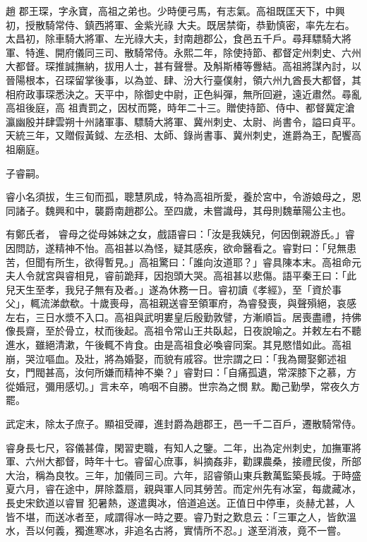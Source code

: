 
\begin{pinyinscope}

 趙
 郡王琛，字永寶，高祖之弟也。少時便弓馬，有志氣。高祖既匡天下，中興初，授散騎常侍、鎮西將軍、金紫光祿
 大夫。既居禁衛，恭勤慎密，率先左右。太昌初，除車騎大將軍、左光祿大夫，封南趙郡公，食邑五千戶。尋拜驃騎大將軍、特進、開府儀同三司、散騎常侍。永熙二年，除使持節、都督定州刺史、六州大都督。琛推誠撫納，拔用人士，甚有聲譽。及斛斯椿等釁結。高祖將謀內討，以晉陽根本，召琛留掌後事，以為並、肆、汾大行臺僕射，領六州九酋長大都督，其相府政事琛悉決之。天平中，除御史中尉，正色糾彈，無所回避，遠近肅然。尋亂高祖後庭，高
 祖責罰之，因杖而斃，時年二十三。贈使持節、侍中、都督冀定滄瀛幽殷并肆雲朔十州諸軍事、驃騎大將軍、冀州刺史、太尉、尚書令，謚曰貞平。天統三年，又贈假黃鉞、左丞相、太師、錄尚書事、冀州刺史，進爵為王，配饗高祖廟庭。



 子睿嗣。



 睿小名須拔，生三旬而孤，聰慧夙成，特為高祖所愛，養於宮中，令游娘母之，恩同諸子。魏興和中，襲爵南趙郡公。至四歲，未嘗識母，其母則魏華陽公主也。



 有鄭氏者，
 睿母之從母姊妹之女，戲語睿曰：「汝是我姨兒，何因倒親游氏。」睿因問訪，遂精神不怡。高祖甚以為怪，疑其感疾，欲命醫看之。睿對曰：「兒無患苦，但聞有所生，欲得暫見。」高祖驚曰：「誰向汝道耶？」睿具陳本末。高祖命元夫人令就宮與睿相見，睿前跪拜，因抱頭大哭。高祖甚以悲傷。語平秦王曰：「此兒天生至孝，我兒子無有及者。」遂為休務一日。睿初讀《孝經》，至「資於事父」，輒流涕歔欷。十歲喪母，高祖親送睿至領軍府，為睿發喪，與聲殞絕，哀感
 左右，三日水漿不入口。高祖與武明婁皇后殷勤敦譬，方漸順旨。居喪盡禮，持佛像長齋，至於骨立，杖而後起。高祖令常山王共臥起，日夜說喻之。并敕左右不聽進水，雖絕清漱，午後輒不肯食。由是高祖食必喚睿同案。其見愍惜如此。高祖崩，哭泣嘔血。及壯，將為婚娶，而貌有戚容。世宗謂之曰：「我為爾娶鄭述祖女，門閥甚高，汝何所嫌而精神不樂？」睿對曰：「自痛孤遺，常深膝下之慕，方從婚冠，彌用感切。」言未卒，嗚咽不自勝。世宗為之憫
 默。勵己勤學，常夜久方罷。



 武定末，除太子庶子。顯祖受禪，進封爵為趙郡王，邑一千二百戶，遷散騎常侍。



 睿身長七尺，容儀甚偉，閑習吏職，有知人之鑒。二年，出為定州刺史，加撫軍將軍、六州大都督，時年十七。睿留心庶事，糾摘姦非，勸課農桑，接禮民俊，所部大治，稱為良牧。三年，加儀同三司。六年，詔睿領山東兵數萬監築長城。于時盛夏六月，睿在途中，屏除蓋扇，親與軍人同其勞苦。而定州先有冰室，每歲藏冰，長史宋欽道以睿冒
 犯暑熱，遂遣輿冰，倍道追送。正值日中停車，炎赫尤甚，人皆不堪，而送冰者至，咸謂得冰一時之要。睿乃對之歎息云：「三軍之人，皆飲溫水，吾以何義，獨進寒冰，非追名古將，實情所不忍。」遂至消液，竟不一嘗。




\end{pinyinscope}
